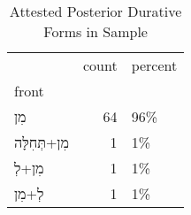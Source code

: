 \begin{table}[htbp!]
\centering
\caption{Attested Posterior Durative Forms in Sample}
\label{table:postdur_front}
\begin{tabular}{lrl}
\toprule
{} &  count & percent \\
front                      &        &         \\
\midrule
\texthebrew{מִן}           &     64 &     96\% \\
\texthebrew{מִן+תְּחִלָּה} &      1 &      1\% \\
\texthebrew{מִן+לְ}        &      1 &      1\% \\
\texthebrew{לְ+מִן}        &      1 &      1\% \\
\bottomrule
\end{tabular}
\end{table}
